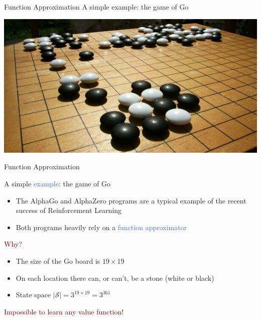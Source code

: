\documentclass{beamer}
\begin{document}
\begin{frame}{Function Approximation}
	A simple example: the game of Go
	\bigskip

	\begin{center}
		\includegraphics[width=\textwidth]{./Images/Go_board}
	\end{center}

\end{frame}

\begin{frame}{Function Approximation}

	A simple \textcolor{RoyalBlue}{example}: the game of Go
	
	\begin{itemize}
		\item The AlphaGo and AlphaZero programs are a typical example of the recent success of Reinforcement Learning
		\item Both programs heavily rely on a \textcolor{RoyalBlue}{function approximator}
	\end{itemize}
	
	\bigskip

	\textcolor{Maroon}{Why?}

	\begin{itemize}
		\item The size of the Go board is $19\times19$
		\item On each location there can, or can't, be a stone (white or black)
		\item State space $|\mathcal{S}| = 3^{19\times19}=3^{361}$
	\end{itemize}

	\bigskip
	
	\centering
	\textcolor{Maroon}{Impossible to learn any value function!}

\end{frame}
\end{document}
